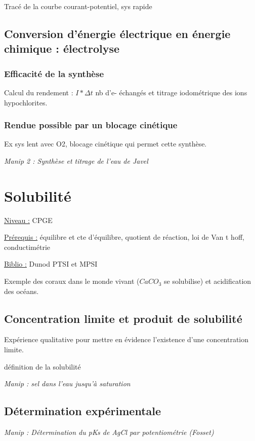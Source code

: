 \documentclass{article}%
\begin{document}
Tracé de la courbe courant-potentiel, sys rapide

\subsection{Conversion d'énergie électrique en énergie chimique : électrolyse}
\subsubsection{Efficacité de la synthèse}

Calcul du rendement : $I*\Delta t$ nb d'e- échangés et titrage iodométrique des ions hypochlorites.

\subsubsection{Rendue possible par un blocage cinétique}

Ex sys lent avec O2, blocage cinétique qui permet cette synthèse.

\textit{Manip 2 : Synthèse et titrage de l'eau de Javel}

\section{Solubilité}
\underline{Niveau :} CPGE 

\underline{Prérequis :} équilibre et cte d'équilibre, quotient de réaction, loi de Van t hoff, conductimétrie 

\underline{Biblio :} Dunod PTSI et MPSI

Exemple des coraux dans le monde vivant ($CaCO_3$ se solubilise) et acidification des océans.

\subsection{Concentration limite et produit de solubilité}

Expérience qualitative pour mettre en évidence l'existence d'une concentration limite.

définition de la solubilité

\textit{Manip : sel dans l'eau jusqu'à saturation}

\subsection{Détermination expérimentale}

\textit{Manip : Détermination du pKs de AgCl par potentiométrie (Fosset)}
\end{document}
